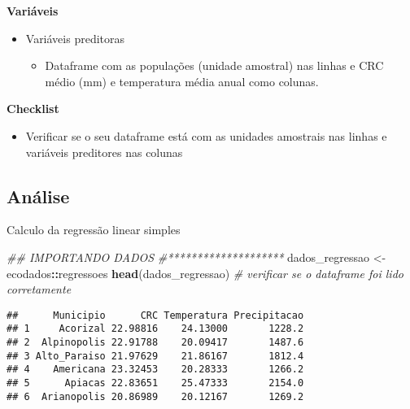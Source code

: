 \documentclass[
]{book}
\newenvironment{Shaded}{\begin{snugshade}}{\end{snugshade}}
\newcommand{\CommentTok}[1]{\textcolor[rgb]{0.56,0.35,0.01}{\textit{#1}}}
\newcommand{\KeywordTok}[1]{\textcolor[rgb]{0.13,0.29,0.53}{\textbf{#1}}}
\newcommand{\NormalTok}[1]{#1}
\newcommand{\OperatorTok}[1]{\textcolor[rgb]{0.81,0.36,0.00}{\textbf{#1}}}
\newcommand{\StringTok}[1]{\textcolor[rgb]{0.31,0.60,0.02}{#1}}
\providecommand{\tightlist}{%
  \setlength{\itemsep}{0pt}\setlength{\parskip}{0pt}}
\begin{document}
\textbf{Variáveis}

\begin{itemize}
\tightlist
\item
  Variáveis preditoras

  \begin{itemize}
  \tightlist
  \item
    Dataframe com as populações (unidade amostral) nas linhas e CRC médio (mm) e temperatura média anual como colunas.
  \end{itemize}
\end{itemize}

\textbf{Checklist}

\begin{itemize}
\tightlist
\item
  Verificar se o seu dataframe está com as unidades amostrais nas linhas e variáveis preditores nas colunas
\end{itemize}

\hypertarget{anuxe1lise-4}{%
\subsection{Análise}\label{anuxe1lise-4}}

Calculo da regressão linear simples

\begin{Shaded}
\begin{Highlighting}[]
\CommentTok{## IMPORTANDO DADOS}
\CommentTok{#********************}
\NormalTok{dados_regressao <-}\StringTok{ }\NormalTok{ecodados}\OperatorTok{::}\NormalTok{regressoes}
\KeywordTok{head}\NormalTok{(dados_regressao) }\CommentTok{# verificar se o dataframe foi lido corretamente}
\end{Highlighting}
\end{Shaded}

\begin{verbatim}
##      Municipio      CRC Temperatura Precipitacao
## 1     Acorizal 22.98816    24.13000       1228.2
## 2  Alpinopolis 22.91788    20.09417       1487.6
## 3 Alto_Paraiso 21.97629    21.86167       1812.4
## 4    Americana 23.32453    20.28333       1266.2
## 5      Apiacas 22.83651    25.47333       2154.0
## 6  Arianopolis 20.86989    20.12167       1269.2
\end{verbatim}
\end{document}
